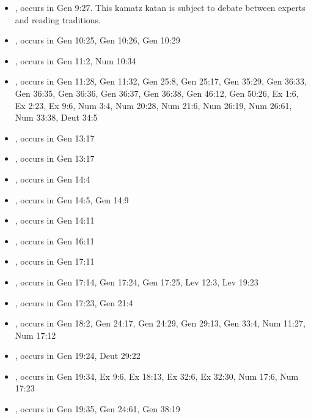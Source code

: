 \documentclass[14pt]{article}
\begin{document}
\begin{itemize}
\item {}, occurs in Gen 9:27. This kamatz katan is subject to debate between experts and reading traditions.

\item {}, occurs in Gen 10:25, Gen 10:26, Gen 10:29

\item {}, occurs in Gen 11:2, Num 10:34

\item {}, occurs in Gen 11:28, Gen 11:32, Gen 25:8, Gen 25:17, Gen 35:29, Gen 36:33, Gen 36:35, Gen 36:36, Gen 36:37, Gen 36:38, Gen 46:12, Gen 50:26, Ex 1:6, Ex 2:23, Ex 9:6, Num 3:4, Num 20:28, Num 21:6, Num 26:19, Num 26:61, Num 33:38, Deut 34:5

\item {}, occurs in Gen 13:17

\item {}, occurs in Gen 13:17

\item {}, occurs in Gen 14:4

\item {}, occurs in Gen 14:5, Gen 14:9

\item {}, occurs in Gen 14:11

\item {}, occurs in Gen 16:11

\item {}, occurs in Gen 17:11

\item {}, occurs in Gen 17:14, Gen 17:24, Gen 17:25, Lev 12:3, Lev 19:23

\item {}, occurs in Gen 17:23, Gen 21:4

\item {}, occurs in Gen 18:2, Gen 24:17, Gen 24:29, Gen 29:13, Gen 33:4, Num 11:27, Num 17:12

\item {}, occurs in Gen 19:24, Deut 29:22

\item {}, occurs in Gen 19:34, Ex 9:6, Ex 18:13, Ex 32:6, Ex 32:30, Num 17:6, Num 17:23

\item {}, occurs in Gen 19:35, Gen 24:61, Gen 38:19


\end{itemize}
\end{document}
